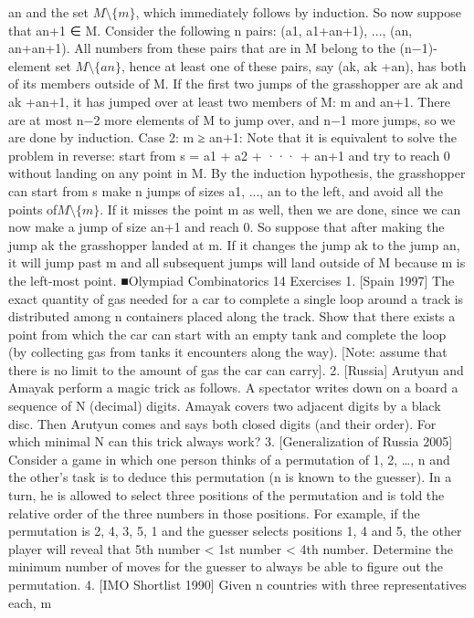 \documentclass[a4paper,11pt]{book}
\begin{document}
an and the set $M\setminus \{m\}$, which immediately follows by induction. So
now suppose that an+1 ∈ M. Consider the following n pairs: (a1,
a1+an+1), ..., (an, an+an+1). All numbers from these pairs that are in
M belong to the (n−1)-element set $M\setminus \{an\}$, hence at least one of
these pairs, say (ak, ak +an), has both of its members outside of M.
If the first two jumps of the grasshopper are ak and ak +an+1, it has
jumped over at least two members of M: m and an+1. There are at
most n−2 more elements of M to jump over, and n−1 more jumps,
so we are done by induction.
Case 2: m ≥ an+1: Note that it is equivalent to solve the problem in
reverse: start from s = a1 + a2 + ··· + an+1 and try to reach 0 without
landing on any point in M. By the induction hypothesis, the
grasshopper can start from s make n jumps of sizes a1, ..., an to the
left, and avoid all the points of$M\setminus \{m\}$. If it misses the point m as
well, then we are done, since we can now make a jump of size an+1
and reach 0. So suppose that after making the jump ak the
grasshopper landed at m. If it changes the jump ak to the jump an,
it will jump past m and all subsequent jumps will land outside of
M because m is the left-most point. ■Olympiad Combinatorics 14
Exercises
1. [Spain 1997]
The exact quantity of gas needed for a car to complete a single
loop around a track is distributed among n containers placed
along the track. Show that there exists a point from which the
car can start with an empty tank and complete the loop (by
collecting gas from tanks it encounters along the way). [Note:
assume that there is no limit to the amount of gas the car can
carry].
2. [Russia]
Arutyun and Amayak perform a magic trick as follows. A
spectator writes down on a board a sequence of N (decimal)
digits. Amayak covers two adjacent digits by a black disc. Then
Arutyun comes and says both closed digits (and their order).
For which minimal N can this trick always work?
3. [Generalization of Russia 2005]
Consider a game in which one person thinks of a permutation
of {1, 2, …, n} and the other’s task is to deduce this
permutation (n is known to the guesser). In a turn, he is
allowed to select three positions of the permutation and is
told the relative order of the three numbers in those positions.
For example, if the permutation is 2, 4, 3, 5, 1 and the guesser
selects positions 1, 4 and 5, the other player will reveal that 5th
number < 1st number < 4th number. Determine the minimum
number of moves for the guesser to always be able to figure
out the permutation.
4. [IMO Shortlist 1990]
Given n countries with three representatives each, m
\end{document}
